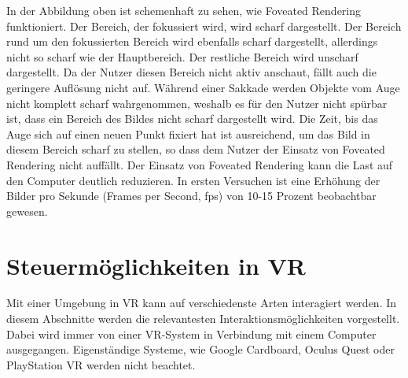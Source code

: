 In der Abbildung oben ist schemenhaft zu sehen, wie Foveated Rendering funktioniert. Der Bereich, der fokussiert wird, wird scharf dargestellt. Der Bereich rund um den fokussierten Bereich wird ebenfalls scharf dargestellt, allerdings nicht so scharf wie der Hauptbereich.  Der restliche Bereich wird unscharf dargestellt. Da der Nutzer diesen Bereich nicht aktiv anschaut, fällt auch die geringere Auflösung nicht auf. Während einer Sakkade werden Objekte vom Auge nicht komplett scharf wahrgenommen, weshalb es für den Nutzer nicht spürbar ist, dass ein Bereich des Bildes nicht scharf dargestellt wird. Die Zeit, bis das Auge sich auf einen neuen Punkt fixiert hat ist ausreichend, um das Bild in diesem Bereich scharf zu stellen, so dass dem Nutzer der Einsatz von Foveated Rendering nicht auffällt\cite{Albert.2017}. Der Einsatz von Foveated Rendering kann die Last auf den Computer deutlich reduzieren. In ersten Versuchen ist eine Erhöhung der Bilder pro Sekunde (Frames per Second, fps) von 10-15 Prozent beobachtbar gewesen\cite{H.Kim.2018}.

\section{Steuermöglichkeiten in VR}
Mit einer Umgebung in VR kann auf verschiedenste Arten interagiert werden. In diesem Abschnitte werden die relevantesten Interaktionsmöglichkeiten vorgestellt. Dabei wird immer von einer VR-System in Verbindung mit einem Computer ausgegangen. Eigenständige Systeme, wie Google Cardboard, Oculus Quest oder PlayStation VR werden nicht beachtet.
